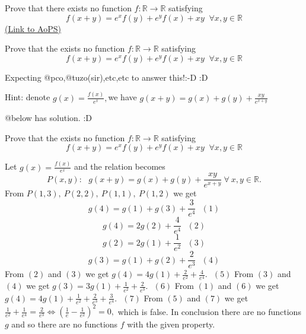 \begin{problem}
	Prove that there exists no function $f: \mathbb{R} \to \mathbb{R}$ satisfying
$$f(x+y)=e^xf(y)+e^yf(x)+xy \;\; \forall x,y\in  \mathbb{R}$$
	\flushright \href{https://artofproblemsolving.com/community/c6h1605422}{(Link to AoPS)}
\end{problem}



\begin{solution}
	\begin{tcolorbox}Prove that the exists no function $f: \mathbb{R} \to \mathbb{R}$ satisfying
$$f(x+y)=e^xf(y)+e^yf(x)+xy \;\; \forall x,y\in  \mathbb{R}$$\end{tcolorbox}

Expecting @pco,@tuzo(sir),etc,etc to answer this!:-D :D
\end{solution}



\begin{solution}
	Hint: denote $g(x)=\frac{f(x)}{e^{x}},$we have $g(x+y)=g(x)+g(y)+\frac{xy}{e^{x+y}}$
\end{solution}



\begin{solution}
	@below has solution. :D
\end{solution}



\begin{solution}
	\begin{tcolorbox}Prove that the exists no function $f: \mathbb{R} \to \mathbb{R}$ satisfying
$$f(x+y)=e^xf(y)+e^yf(x)+xy \;\; \forall x,y\in  \mathbb{R}$$\end{tcolorbox}

Let $g(x)=\frac{f(x)}{e^x}$ and the relation becomes $$P(x,y):~~~g(x+y)=g(x)+g(y)+ \frac{xy}{e^{x+y}} ~\forall~ x,y \in \mathbb{R}.$$
From $P(1,3),~P(2,2),~P(1,1),~P(1,2)$ we get $$g(4)=g(1)+g(3)+ \frac{3}{e^4}~~~(1)$$ $$g(4)=2g(2)+ \frac{4}{e^4}~~~(2)$$ $$g(2)=2g(1)+ \frac{1}{e^2}~~~(3)$$ $$g(3)=g(1)+g(2)+ \frac{2}{e^3}~~~(4)$$
From $(2)$ and $(3)$ we get $g(4)=4g(1)+ \frac{2}{e^2}+ \frac{4}{e^4}.~~~(5)$
From $(3)$ and $(4)$ we get $g(3)=3g(1)+ \frac{1}{e^2}+ \frac{2}{e^3}.~~~(6)$
From $(1)$ and $(6)$ we get $g(4)=4g(1)+ \frac{1}{e^2}+ \frac{2}{e^3}+ \frac{3}{e^4}.~~~(7)$
From $(5)$ and $(7)$ we get $\frac{1}{e^2}+ \frac{1}{e^4}= \frac{2}{e^3} \Leftrightarrow \left( \frac{1}{e}- \frac{1}{e^2} \right)^2=0,$ which is false. 
In conclusion there are no functions $g$ and so there are no functions $f$ with the given property.
\end{solution}



